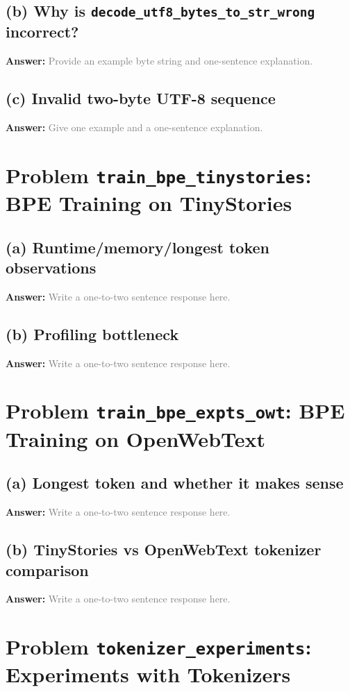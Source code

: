 \documentclass[11pt]{article}
\newcommand{\answer}{\textbf{Answer:} \vspace{1.5em}}
\newcommand{\placeholder}[1]{\textcolor{gray}{#1}}
\begin{document}
\subsection*{(b) Why is \texttt{decode\_utf8\_bytes\_to\_str\_wrong} incorrect?}
\answer
\placeholder{Provide an example byte string and one-sentence explanation.}

\subsection*{(c) Invalid two-byte UTF-8 sequence}
\answer
\placeholder{Give one example and a one-sentence explanation.}

\section{Problem \texttt{train\_bpe\_tinystories}: BPE Training on TinyStories}
\subsection*{(a) Runtime/memory/longest token observations}
\answer
\placeholder{Write a one-to-two sentence response here.}

\subsection*{(b) Profiling bottleneck}
\answer
\placeholder{Write a one-to-two sentence response here.}

\section{Problem \texttt{train\_bpe\_expts\_owt}: BPE Training on OpenWebText}
\subsection*{(a) Longest token and whether it makes sense}
\answer
\placeholder{Write a one-to-two sentence response here.}

\subsection*{(b) TinyStories vs OpenWebText tokenizer comparison}
\answer
\placeholder{Write a one-to-two sentence response here.}

\section{Problem \texttt{tokenizer\_experiments}: Experiments with Tokenizers}
\end{document}
